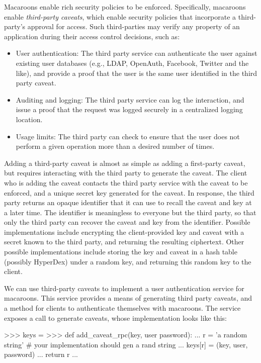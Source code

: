 Macaroons enable rich security policies to be enforced. Specifically, macaroons 
enable {\em third-party caveats}, which enable security policies that incorporate
a third-party's approval for access.  Such third-parties may verify any property 
of an application during their access control decisions, such as:

\begin{itemize}
    \item User authentication:  The third party service can authenticate the
        user against existing user databases (e.g., LDAP, OpenAuth, Facebook, Twitter and the like), and
        provide a proof that the user is the same user identified in the third
        party caveat.
    \item Auditing and logging:  The third party service can log the
        interaction, and issue a proof that the request was logged securely in a
        centralized logging location.
    \item Usage limits: The third party can check to ensure that the user
        does not perform a given operation more than a desired number of
        times.
\end{itemize}

Adding a third-party caveat is almost as simple as adding a first-party caveat,
but requires interacting with the third party to generate the caveat.  The
client who is adding the caveat contacts the third party service with the caveat
to be enforced, and a unique secret key generated for the caveat.  In response,
the third party returns an opaque identifier that it can use to recall the
caveat and key at a later time.  The identifier is meaningless to everyone but
the third party, so that only the third party can recover the caveat and key
from the identifier.  Possible implementations include encrypting the
client-provided key and caveat with a secret known to the third party, and
returning the resulting ciphertext.  Other possible implementations include
storing the key and caveat in a hash table (possibly HyperDex) under a random
key, and returning this random key to the client.

We can use third-party caveats to implement a user authentication service for
macaroons.  This service provides a means of generating third party caveats, and
a method for clients to authenticate themselves with macaroons.  The service
exposes a call to generate caveats, whose implementation looks like this:

\begin{pythoncode}
>>> keys = {}
>>> def add_caveat_rpc(key, user password):
...     r = 'a random string' # your implementation should gen a rand string
...     keys[r] = (key, user, password)
...     return r
...
\end{pythoncode}

